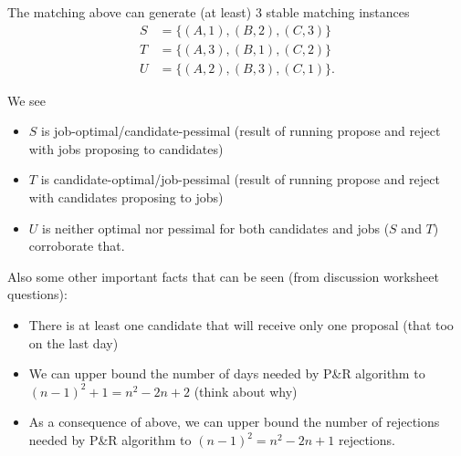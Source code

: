 The matching above can generate (at least) 3 stable matching instances \begin{align*}
    S &= \{(A,1), (B,2), (C,3)\} \\
    T &= \{(A,3), (B,1), (C,2)\} \\
    U &= \{(A,2), (B,3), (C,1)\}. 
\end{align*}

We see \begin{itemize}
    \item $S$ is job-optimal/candidate-pessimal (result of running propose and reject with jobs proposing to candidates)
    \item $T$ is candidate-optimal/job-pessimal (result of running propose and reject with candidates proposing to jobs)
    \item $U$ is neither optimal nor pessimal for both candidates and jobs ($S$ and $T$) corroborate that. 
\end{itemize}

Also some other important facts that can be seen (from discussion worksheet questions):
\begin{itemize}
    \item There is at least one candidate that will receive only one proposal (that too on the last day)
    \item We can upper bound the number of days needed by P\&R algorithm to $(n-1)^2 + 1 = n^2-2n+2$ (think about why)
    \item As a consequence of above, we can upper bound the number of rejections needed by P\&R algorithm to $(n-1)^2  = n^2 - 2n + 1$ rejections. 
\end{itemize}